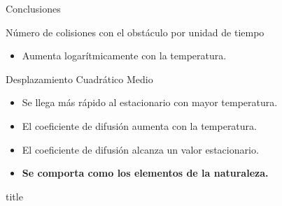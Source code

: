 \documentclass{beamer}
\begin{document}
        \begin{frame}{Conclusiones}
            \begin{block}{Número de colisiones con el obstáculo por unidad de tiempo}
                \begin{itemize}
                    \item Aumenta logarítmicamente con la temperatura.
                \end{itemize}
            \end{block}
            \begin{block}{Desplazamiento Cuadrático Medio}
                \begin{itemize}
                    \item Se llega más rápido al estacionario con mayor temperatura.
                    \item El coeficiente de difusión aumenta con la temperatura.
                    \item El coeficiente de difusión alcanza un valor estacionario.
                    \item \textbf{Se comporta como los elementos de la naturaleza.}
                \end{itemize}
            \end{block}
        \end{frame}

        \begin{frame}
            \begin{beamercolorbox}[sep=8pt,center]{title}
            \end{beamercolorbox}
        \end{frame}
\end{document}
